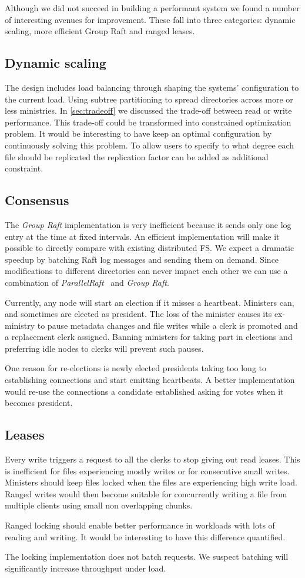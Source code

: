Although we did not succeed in building a performant system we found a number of interesting avenues for improvement. These fall into three categories: dynamic scaling, more efficient Group Raft and ranged leases.

\subsection{Dynamic scaling}
The \name design includes load balancing through shaping the systems' configuration to the current load. Using subtree partitioning to spread directories across more or less ministries. In \cref{sec:tradeoff} we discussed the trade-off between read or write performance. This trade-off could be transformed into constrained optimization problem. It would be interesting to have \name{} keep an optimal configuration by continuously solving this problem. To allow users to specify to what degree each file should be replicated the replication factor can be added as additional constraint.

\subsection{Consensus}
The \textit{Group Raft} implementation is very inefficient because it sends only one log entry at the time at fixed intervals. An efficient implementation will make it possible to directly compare \name{} with existing distributed FS. We expect a dramatic speedup by batching Raft log messages and sending them on demand. Since modifications to different directories can never impact each other we can use a combination of \textit{ParallelRaft}~\cite{polarfs} and \textit{Group Raft}.

Currently, any node will start an election if it misses a heartbeat. Ministers can, and sometimes are elected as president. The loss of the minister causes its ex-ministry to pause metadata changes and file writes while a clerk is promoted and a replacement clerk assigned. Banning ministers for taking part in elections and preferring idle nodes to clerks will prevent such pauses.

One reason for re-elections is newly elected presidents taking too long to establishing connections and start emitting heartbeats. A better implementation would re-use the connections a candidate established asking for votes when it becomes president.

\subsection{Leases}
Every write triggers a request to all the clerks to stop giving out read leases. This is inefficient for files experiencing mostly writes or for consecutive small writes. Ministers should keep files locked when the files are experiencing high write load. Ranged writes would then become suitable for concurrently writing a file from multiple clients using small non overlapping chunks.

Ranged locking should enable better performance in workloads with lots of reading and writing. It would be interesting to have this difference quantified.

The locking implementation does not batch requests. We suspect batching will significantly increase throughput under load.
